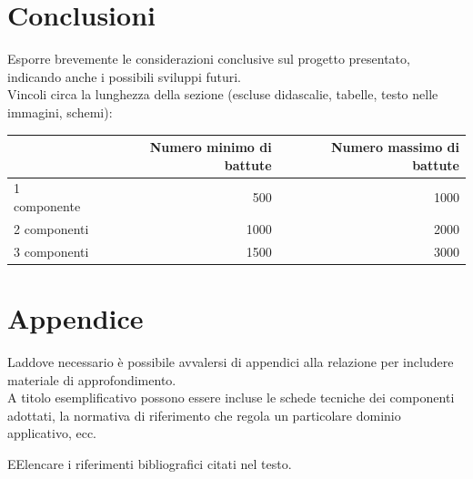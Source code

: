 \documentclass[12pt]{article}
\begin{document}
\newpage



\section{Conclusioni}

Esporre brevemente le considerazioni conclusive sul progetto presentato, indicando anche i possibili sviluppi futuri.\\

Vincoli circa la lunghezza della sezione (escluse didascalie, tabelle, testo nelle immagini, schemi):

\vspace{1cm}
\begin{tabular}{l|rr}
 & Numero minimo di battute & Numero massimo di battute \\
 \hline
 1 componente & 500 & 1000 \\
 2 componenti & 1000 & 2000 \\
 3 componenti & 1500 & 3000 \\
 \hline
\end{tabular}

\newpage



\appendix
{}
\section*{Appendice}
Laddove necessario è possibile avvalersi di appendici alla relazione per includere materiale di approfondimento.\\

A titolo esemplificativo possono essere incluse le schede tecniche dei componenti adottati, la normativa di riferimento che regola un particolare dominio applicativo, ecc.


\newpage


\begin{thebibliography}
EElencare i riferimenti bibliografici citati nel testo. 
\end{thebibliography}

\end{document}
